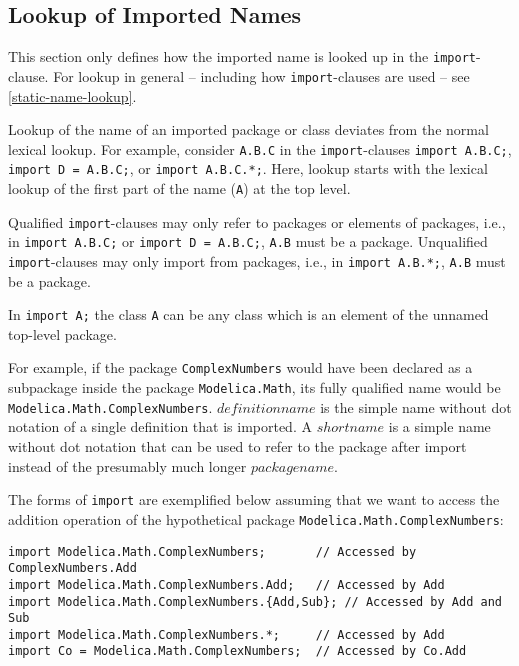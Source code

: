 \subsection{Lookup of Imported Names}\label{lookup-of-imported-names}

This section only defines how the imported name is looked up in the \lstinline!import!-clause.
For lookup in general -- including how \lstinline!import!-clauses are used -- see \cref{static-name-lookup}.

Lookup of the name of an imported package or class deviates from the normal lexical lookup.
For example, consider \lstinline!A.B.C! in the \lstinline!import!-clauses \lstinline!import A.B.C;!, \lstinline!import D = A.B.C;!, or \lstinline!import A.B.C.*;!.
Here, lookup starts with the lexical lookup of the first part of the name (\lstinline!A!) at the top level.

Qualified \lstinline!import!-clauses may only refer to packages or elements of packages, i.e., in \lstinline!import A.B.C;! or \lstinline!import D = A.B.C;!, \lstinline!A.B! must be a package.
Unqualified \lstinline!import!-clauses may only import from packages, i.e., in \lstinline!import A.B.*;!, \lstinline!A.B! must be a package.

\begin{nonnormative}
In \lstinline!import A;! the class \lstinline!A! can be any class which is an element of the unnamed top-level package.
\end{nonnormative}

\begin{nonnormative}
For example, if the package \lstinline!ComplexNumbers! would have been declared as a subpackage inside the package \lstinline!Modelica.Math!, its fully qualified name would be
\lstinline!Modelica.Math.ComplexNumbers!.  $\mathit{definitionname}$ is the simple name without dot notation of a single definition that is imported.  A $\mathit{shortname}$ is
a simple name without dot notation that can be used to refer to the package after import instead of the presumably much longer $\mathit{packagename}$.

The forms of \lstinline!import! are exemplified below assuming that we want to access the addition operation of the hypothetical package \lstinline!Modelica.Math.ComplexNumbers!:
\begin{lstlisting}[language=modelica]
import Modelica.Math.ComplexNumbers;       // Accessed by ComplexNumbers.Add
import Modelica.Math.ComplexNumbers.Add;   // Accessed by Add
import Modelica.Math.ComplexNumbers.{Add,Sub}; // Accessed by Add and Sub
import Modelica.Math.ComplexNumbers.*;     // Accessed by Add
import Co = Modelica.Math.ComplexNumbers;  // Accessed by Co.Add
\end{lstlisting}
\end{nonnormative}

